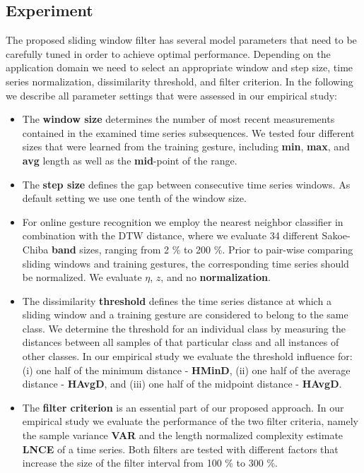 \subsection{Experiment} \label{experiment}

The proposed sliding window filter has several model parameters that need to be carefully tuned in order to achieve optimal performance. Depending on the application domain we need to select an appropriate window and step size, time series normalization, dissimilarity threshold, and filter criterion. In the following we describe all parameter settings that were assessed in our empirical study: 

\begin{itemize}

\item 
The \textbf{window size} determines the number of most recent measurements contained in the examined time series subsequences. We tested four different sizes that were learned from the training gesture, including \textbf{min}, \textbf{max}, and \textbf{avg} length as well as the \textbf{mid}-point of the range. \\
      
\item 
The \textbf{step size} defines the gap between consecutive time series windows. As default setting we use one tenth of the window size. \\
        
\item 
For online gesture recognition we employ the nearest neighbor classifier in combination with the DTW distance, where we evaluate 34 different Sakoe-Chiba \textbf{band} sizes, ranging from 2 \% to 200 \%. 
Prior to pair-wise comparing sliding windows and training gestures, the corresponding time series should be normalized. We evaluate $\eta$, $z$, and no \textbf{normalization}. \\

\item 
The dissimilarity \textbf{threshold} defines the time series distance at which a sliding window and a training gesture are considered to belong to the same class. We determine the threshold for an individual class by measuring the distances between all samples of that particular class and all instances of other classes. In our empirical study we evaluate the threshold influence for: (i) one half of the minimum distance - \textbf{HMinD}, (ii) one half of the average distance - \textbf{HAvgD}, and (iii) one half of the midpoint distance - \textbf{HAvgD}. \\  

\item 
The \textbf{filter criterion} is an essential part of our proposed approach. In our empirical study we evaluate the performance of the two filter criteria, namely the sample variance \textbf{VAR} and the length normalized complexity estimate \textbf{LNCE} of a time series. Both filters are tested with different factors that increase the size of the filter interval from 100 \% to 300 \%.

\end{itemize}

